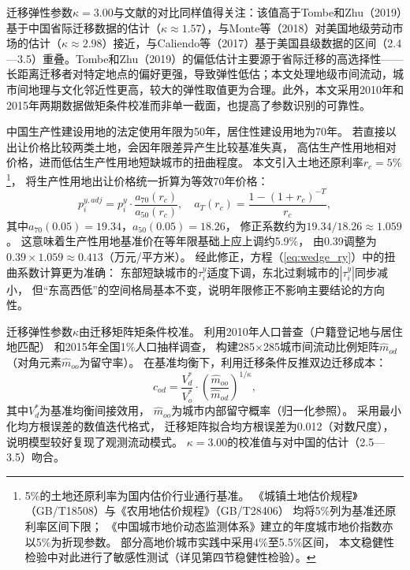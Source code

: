 \documentclass[UTF8,a4paper,12pt]{ctexart}
\theoremstyle{plain}
\theoremstyle{definition}
\theoremstyle{remark}
\newcommand{\tauy}{\tau^{y}}
\begin{document}
迁移弹性参数$\kappa=3.00$与文献的对比同样值得关注：该值高于Tombe和Zhu（2019）基于中国省际迁移数据的估计（$\kappa\approx 1.57$），与Monte等（2018）对美国地级劳动市场的估计（$\kappa\approx 2.98$）接近，与Caliendo等（2017）基于美国县级数据的区间（2.4—3.5）重叠。Tombe和Zhu（2019）的偏低估计主要源于省际迁移的高选择性——长距离迁移者对特定地点的偏好更强，导致弹性低估；本文处理地级市间流动，城市间地理与文化邻近性更高，较大的弹性取值更为合理。此外，本文采用2010年和2015年两期数据做矩条件校准而非单一截面，也提高了参数识别的可靠性。

中国生产性建设用地的法定使用年限为50年，居住性建设用地为70年。
若直接以出让价格比较两类土地，会因年限差异产生比较基准失真，
高估生产性用地相对价格，进而低估生产性用地短缺城市的扭曲程度。
本文引入土地还原利率$r_c=5\%$\footnote{%
  5\%的土地还原利率为国内估价行业通行基准。
  《城镇土地估价规程》（GB/T18508）与《农用地估价规程》（GB/T28406）
  均将5\%列为基准还原利率区间下限；
  《中国城市地价动态监测体系》建立的年度城市地价指数亦以5\%为折现参数。
  部分高地价城市实践中采用4\%至5.5\%区间，
  本文稳健性检验中对此进行了敏感性测试（详见第四节稳健性检验）。}，
将生产性用地出让价格统一折算为等效70年价格：
\begin{equation}
  p_i^{y,adj}=p_i^y\cdot\frac{a_{70}(r_c)}{a_{50}(r_c)},
  \quad a_T(r_c)=\frac{1-(1+r_c)^{-T}}{r_c},
  \label{eq:land_adj}
\end{equation}
其中$a_{70}(0.05)=19.34$，$a_{50}(0.05)=18.26$，
修正系数约为$19.34/18.26\approx 1.059$。
这意味着生产性用地基准价在等年限基础上应上调约5.9\%，
由0.39调整为$0.39\times1.059\approx0.413$（万元/平方米）。
经此修正，方程（\ref{eq:wedge_ry}）中的扭曲系数计算更为准确：
东部短缺城市的$\tauy_i$适度下调，东北过剩城市的$|\tauy_i|$同步减小，
但``东高西低''的空间格局基本不变，说明年限修正不影响主要结论的方向性。

迁移弹性参数$\kappa$由迁移矩阵矩条件校准。
利用2010年人口普查（户籍登记地与居住地匹配）
和2015年全国1\%人口抽样调查，
构建285×285城市间流动比例矩阵$\hat{m}_{od}$（对角元素$\hat{m}_{oo}$为留守率）。
在基准均衡下，利用迁移条件反推双边迁移成本：
\begin{equation}
  c_{od}=\frac{V_d^*}{V_o^*}\cdot\left(\frac{\hat{m}_{oo}}{\hat{m}_{od}}\right)^{1/\kappa},
  \label{eq:mig_cost}
\end{equation}
其中$V_d^*$为基准均衡间接效用，
$\hat{m}_{oo}$为城市内部留守概率（归一化参照）。
采用最小化均方根误差的数值迭代格式，
迁移矩阵拟合均方根误差为0.012（对数尺度），
说明模型较好复现了观测流动模式。
$\kappa=3.00$的校准值与\citet{redding2017}对中国的估计（2.5—3.5）吻合。
\end{document}
